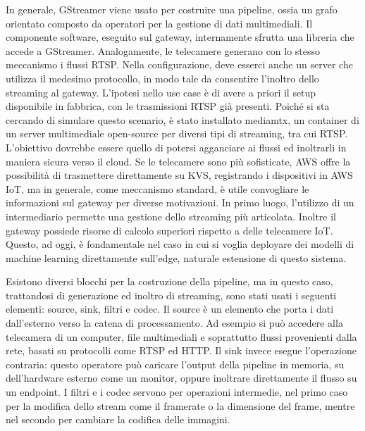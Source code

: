 In generale, GStreamer viene usato per costruire una pipeline, ossia un grafo orientato composto da operatori per la gestione di dati multimediali. Il componente software, eseguito sul gateway, internamente sfrutta una libreria che accede a GStreamer. %
Analogamente, le telecamere generano con lo stesso meccanismo i flussi RTSP. Nella configurazione, deve esserci anche un server che utilizza il medesimo protocollo, in modo tale da consentire l'inoltro dello streaming al gateway. L'ipotesi nello use case è di avere a priori il setup disponibile in fabbrica, con le trasmissioni RTSP già presenti. Poiché si sta cercando di simulare questo scenario, è stato installato mediamtx, un container di un server multimediale open-source per diversi tipi di streaming, tra cui RTSP. L'obiettivo dovrebbe essere quello di potersi agganciare ai flussi ed inoltrarli in maniera sicura verso il cloud. Se le telecamere sono più sofisticate, AWS offre la possibilità di trasmettere direttamente su KVS, registrando i dispositivi in AWS IoT, ma in generale, come meccanismo standard, è utile convogliare le informazioni sul gateway per diverse motivazioni. In primo luogo, l'utilizzo di un intermediario permette una gestione dello streaming più articolata. Inoltre il gateway possiede risorse di calcolo superiori rispetto a delle telecamere IoT. Questo, ad oggi, è fondamentale nel caso in cui si voglia deployare dei modelli di machine learning direttamente sull'edge, naturale estensione di questo sistema.

Esistono diversi blocchi per la costruzione della pipeline, ma in questo caso, trattandosi di generazione ed inoltro di streaming, sono stati usati i seguenti elementi: source, sink, filtri e codec. Il source è un elemento che porta i dati dall'esterno verso la catena di processamento. Ad esempio si può accedere alla telecamera di un computer, file multimediali e soprattutto flussi provenienti dalla rete, basati su protocolli come RTSP ed HTTP. Il sink invece esegue l'operazione contraria: questo operatore può caricare l'output della pipeline in memoria, su dell'hardware esterno come un monitor, oppure inoltrare direttamente il flusso su un endpoint. I filtri e i codec servono per operazioni intermedie, nel primo caso per la modifica dello stream come il framerate o la dimensione del frame, mentre nel secondo per cambiare la codifica delle immagini. 


